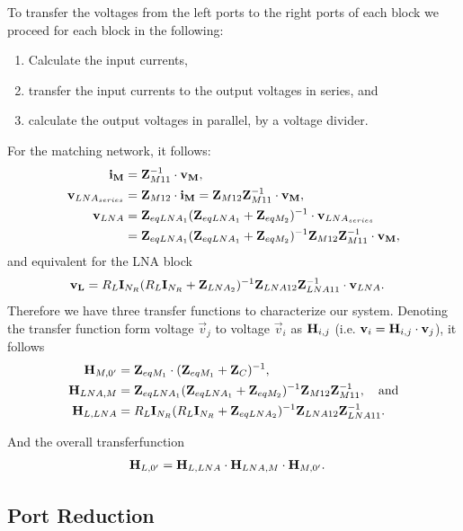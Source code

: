 To transfer the voltages from the left ports to the right ports of each block we proceed for each block in the following: 
\begin{enumerate}
\item{Calculate the input currents,}
\item{transfer the input currents to the output voltages in series, and}
\item{calculate the output voltages in parallel, by a voltage divider.}
\end{enumerate}
For the matching network, it follows:
\begin{align}
\mathbf{i_M} &= \mathbf{Z}_{M11}^{-1}\cdot\mathbf{v_M},\\
\mathbf{v}_{LNA_{series}} &= \mathbf{Z}_{M12}\cdot\mathbf{i_M} = \mathbf{Z}_{M12} \mathbf{Z}_{M11}^{-1}\cdot\mathbf{v_M},\\
\mathbf{v}_{LNA} &= \mathbf{Z}_{eqLNA_1}(\mathbf{Z}_{eqLNA_1}+\mathbf{Z}_{eqM_2})^{-1}\cdot\mathbf{v}_{LNA_{series}}\\\nonumber
&=\mathbf{Z}_{eqLNA_1}(\mathbf{Z}_{eqLNA_1}+\mathbf{Z}_{eqM_2})^{-1}\mathbf{Z}_{M12} \mathbf{Z}_{M11}^{-1}\cdot\mathbf{v_M},
\end{align}
and equivalent for the LNA block
\begin{align}
\mathbf{v_{L}}&=R_L\mathbf{I}_{N_R}(R_L\mathbf{I}_{N_R}+\mathbf{Z}_{LNA_2})^{-1}\mathbf{Z}_{LNA12}\mathbf{Z}_{LNA11}^{-1}\cdot\mathbf{v}_{LNA}.
\end{align}
Therefore we have three transfer functions to characterize our system.
Denoting the transfer function form voltage $\vec{v}_j$ to voltage $\vec{v}_i$ as $\mathbf{H}_{i,j}$ (i.e. $\mathbf{v}_i = \mathbf{H}_{i,j} \cdot\mathbf{v}_j$), it follows
\begin{align}
\mathbf{H}_{M,0'} &= \mathbf{Z}_{eqM_1}\cdot(\mathbf{Z}_{eqM_1} + \mathbf{Z}_{C})^{-1}, \\
\mathbf{H}_{LNA,M} &= \mathbf{Z}_{eqLNA_1}(\mathbf{Z}_{eqLNA_1}+\mathbf{Z}_{eqM_2})^{-1}\mathbf{Z}_{M12} \mathbf{Z}_{M11}^{-1},\quad\text{and}\\
\mathbf{H}_{L,LNA} &= R_L\mathbf{I}_{N_R}(R_L\mathbf{I}_{N_R}+\mathbf{Z}_{eqLNA_2})^{-1}\mathbf{Z}_{LNA12}\mathbf{Z}_{LNA11}^{-1}.
\end{align}

And the overall transferfunction
\begin{align}
\label{eq:transf_func}
\mathbf{H}_{L,0'} &= \mathbf{H}_{L,LNA}\cdot\mathbf{H}_{LNA,M}\cdot\mathbf{H}_{M,0'}.
\end{align}

\subsection{Port Reduction}
\label{sec:port_reduction}

